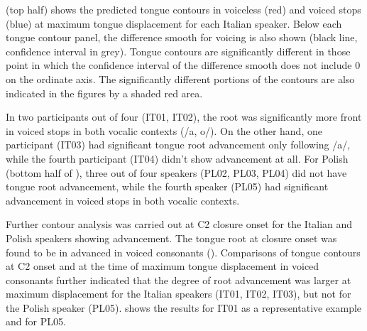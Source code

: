 \documentclass[authoryear, twocolumn]{elsarticle}
\begin{document}
 (top half) shows the predicted tongue contours in voiceless
(red) and voiced stops (blue) at maximum tongue displacement for each
Italian speaker. Below each tongue contour panel, the difference smooth
for voicing is also shown (black line, confidence interval in grey).
Tongue contours are significantly different in those point in which the
confidence interval of the difference smooth does not include 0 on the
ordinate axis. The significantly different portions of the contours are
also indicated in the figures by a shaded red area.

In two participants out of four (IT01, IT02), the root was significantly
more front in voiced stops in both vocalic contexts (/a, o/). On the
other hand, one participant (IT03) had significant tongue root
advancement only following /a/, while the fourth participant (IT04)
didn't show advancement at all. For Polish (bottom half of
), three out of four speakers (PL02, PL03, PL04) did not
have tongue root advancement, while the fourth speaker (PL05) had
significant advancement in voiced stops in both vocalic contexts.

Further contour analysis was carried out at C2 closure onset for the
Italian and Polish speakers showing advancement. The tongue root at
closure onset was found to be in advanced in voiced consonants ().
Comparisons of tongue contours at C2 onset and at the time of maximum
tongue displacement in voiced consonants further indicated that the
degree of root advancement was larger at maximum displacement for the
Italian speakers (IT01, IT02, IT03), but not for the Polish speaker
(PL05).  shows the results for IT01 as a representative
example and for PL05.
\end{document}
